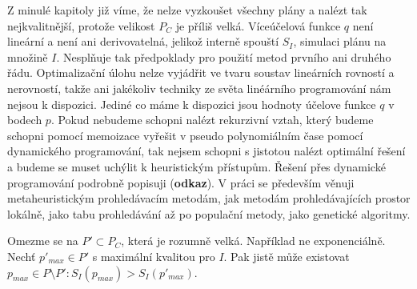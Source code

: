 Z minulé kapitoly již víme, že nelze vyzkoušet všechny plány a nalézt tak nejkvalitnější, protože velikost $P_C$ je příliš velká.
Víceúčelová funkce $q$ není lineární a není ani derivovatelná, jelikož interně spouští $S_I$, simulaci plánu na množině $I$.
Nesplňuje tak předpoklady pro použití metod prvního ani druhého řádu.
Optimalizační úlohu nelze vyjádřit ve tvaru soustav lineárních rovností a nerovností, takže ani jakékoliv techniky ze světa linéárního programování nám nejsou k dispozici.
Jediné co máme k dispozici jsou hodnoty účelove funkce $q$ v bodech $p$.
Pokud nebudeme schopni nalézt rekurzivní vztah, který budeme schopni pomocí memoizace vyřešit v pseudo polynomiálním čase pomocí dynamického programování, tak nejsem schopni
s jistotou nalézt optimální řešení a budeme se muset uchýlit k heuristickým přístupům.
Řešení přes dynamické programování podrobně popisuji (\textbf{odkaz}).
V práci se především věnuji metaheuristickým prohledávacím metodám, %
jak metodám prohledávajících prostor lokálně, jako tabu prohledávání až po populační metody, jako genetické algoritmy.


Omezme se na $P' \subset P_C$, která je rozumně velká. Například ne exponenciálně.
Nechť $p'_{max} \in P'$ s maximální kvalitou pro $I$.
Pak jistě může existovat $p_{max} \in P \setminus P' \colon S_{I}(p_{max}) > S_{I}(p'_{max})$.
\\
\\


